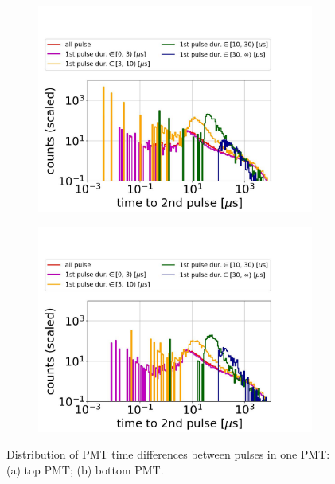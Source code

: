 \begin{figure}[!p]
	\centering
	\begin{subfigure}[t]{\twofigurewidth}
		\centering
		\includegraphics[width=\textwidth,clip,trim={0 0 0 0},angle=0,origin=c]{Figures/GasTest/DatasetQuality/topPMTdeadtime64767.jpg}
		\caption{}
		\label{fig:PMTdeadtime top}
	\end{subfigure}
	\begin{subfigure}[t]{\twofigurewidth}
		\centering
		\includegraphics[width=\textwidth,clip,trim={0 0 0 0}]{Figures/GasTest/DatasetQuality/botPMTdeadtime64767.jpg}
		\caption{}
		\label{fig:PMTdeadtime bottom}
	\end{subfigure}
	\caption[Distribution of PMT time differences between pulses in one PMT.]{Distribution of PMT time differences between pulses in one PMT: (a) top PMT; (b) bottom PMT. }
	\label{fig:PMTdeadtime}
\end{figure}

